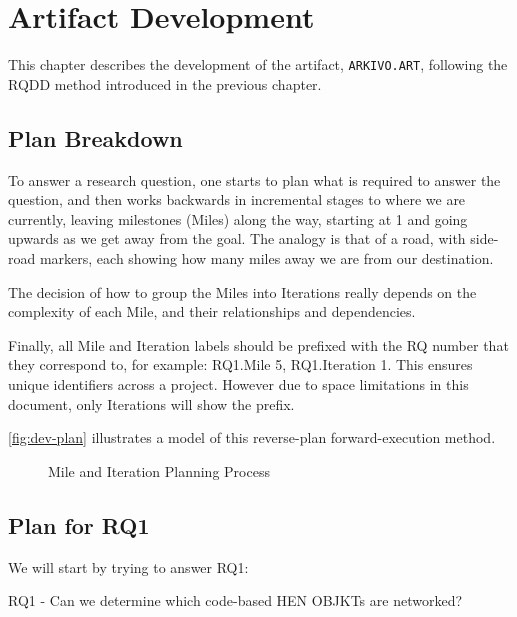 \chapter{Artifact Development}

This chapter describes the development of the artifact, \texttt{ARKIVO.ART}, following the RQDD method introduced in the previous chapter.

\section{Plan Breakdown}

To answer a research question, one starts to plan what is required to answer the question, and then works backwards in incremental stages to where we are currently, leaving milestones (Miles) along the way, starting at 1 and going upwards as we get away from the goal. The analogy is that of a road, with side-road markers, each showing how many miles away we are from our destination.

The decision of how to group the Miles into Iterations really depends on the complexity of each Mile, and their relationships and dependencies.

Finally, all Mile and Iteration labels should be prefixed with the RQ number that they correspond to, for example: RQ1.Mile 5, RQ1.Iteration 1. This ensures unique identifiers across a project. However due to space limitations in this document, only Iterations will show the prefix.

\autoref{fig:dev-plan} illustrates a model of this reverse-plan forward-execution method.

\begin{figure}[h]
    \centering
    
    \caption[Mile and Iteration Planning Process]{Mile and Iteration Planning Process}
    \label{fig:dev-plan}
\end{figure}

\section{Plan for RQ1}

We will start by trying to answer RQ1:

\vspace{0.5cm}

RQ1 - Can we determine which code-based HEN OBJKTs are networked?

\vspace{0.5cm}

